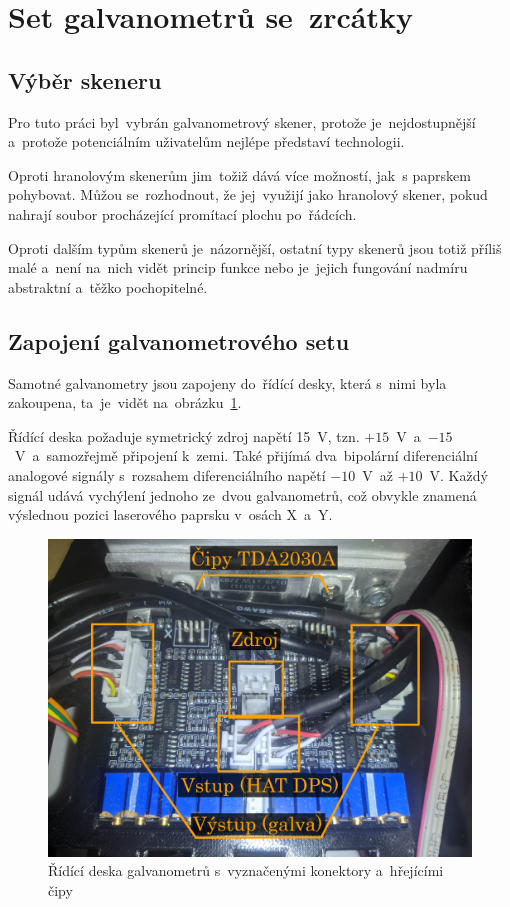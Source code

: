 \section{Set galvanometrů se~zrcátky} \label{sec:my-galvos}
\subsection{Výběr skeneru}
Pro tuto práci byl~vybrán galvanometrový skener, protože je~nejdostupnější a~protože potenciálním uživatelům nejlépe představí technologii.

Oproti hranolovým skenerům jim~tožiž dává více možností, jak~s paprskem pohybovat.
Můžou se~rozhodnout, že jej~využijí jako hranolový skener, pokud nahrají soubor procházející promítací plochu po~řádcích.

Oproti dalším typům skenerů je~názornější, ostatní typy skenerů jsou totiž příliš malé a~není na~nich vidět princip funkce nebo je~jejich fungování nadmíru abstraktní a~těžko pochopitelné.

\subsection{Zapojení galvanometrového setu}
Samotné galvanometry jsou zapojeny do~řídící desky, která s~nimi byla zakoupena, ta~je~vidět na~obrázku~\ref{fig:hw_galvoboard}.

Řídící deska požaduje symetrický zdroj napětí 15~V, tzn. $+15$~V~a~$-15$~V~a~samozřejmě připojení k~zemi. Také přijímá dva~bipolární diferenciální analogové signály s~rozsahem diferenciálního napětí $-10$~V~až $+10$~V. Každý signál udává vychýlení jednoho ze~dvou galvanometrů, což obvykle znamená výslednou pozici laserového paprsku v~osách X~a~Y.

\begin{figure}[htb]
  \centering
  \includegraphics[width=1\textwidth]{img/hw_galvoboard.jpg}
  \caption{\label{fig:hw_galvoboard} Řídící deska galvanometrů s~vyznačenými konektory a~hřejícími čipy}
\end{figure}

